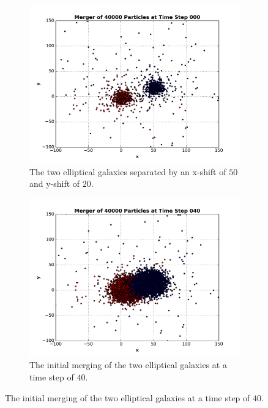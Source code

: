 \documentclass[12pt]{report}
\begin{document}
\begin{figure}[H]
        \centering
        \begin{subfigure}[b]{0.48\textwidth}
            \centering
            \includegraphics[width=\linewidth]{mergert000.png}
            \caption[]%
            {{\small The two elliptical galaxies separated by an x-shift of $50$ and y-shift of $20$.}}    
            \label{fig:merger1_t00}
        \end{subfigure}
        \hfill
        \begin{subfigure}[b]{0.48\textwidth}  
            \centering 
            \includegraphics[width=\linewidth]{mergert040.png}
            \caption[]%
            {{\small The initial merging of the two elliptical galaxies at a time step of $40$.}}    

\end{subfigure}
\end{figure}
\end{document}
